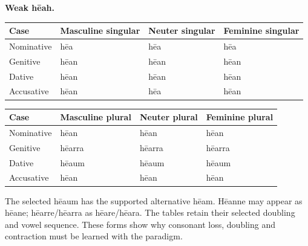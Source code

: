 \par\begin{minipage}{\linewidth}\raggedright
\textbf{Weak hēah.}

\par\begingroup
\fontsize{10.5}{13.2}\selectfont
\setlength{\LTleft}{0pt}\setlength{\LTright}{\fill}
\noindent
\begin{tabular}{@{}>{\raggedright\arraybackslash}p{22.0mm}>{\raggedright\arraybackslash}p{31.188mm}>{\raggedright\arraybackslash}p{31.188mm}>{\raggedright\arraybackslash}p{31.188mm}@{}}
\toprule
\textbf{Case} & \textbf{Masculine singular} & \textbf{Neuter singular} & \textbf{Feminine singular} \\
\midrule
Nominative & hēa & hēa & hēa \\
Genitive & hēan & hēan & hēan \\
Dative & hēan & hēan & hēan \\
Accusative & hēan & hēa & hēan \\
\bottomrule
\end{tabular}
\par\endgroup
\par\addvspace{5pt}
\par\begingroup
\fontsize{10.5}{13.2}\selectfont
\setlength{\LTleft}{0pt}\setlength{\LTright}{\fill}
\noindent
\begin{tabular}{@{}>{\raggedright\arraybackslash}p{22.0mm}>{\raggedright\arraybackslash}p{31.188mm}>{\raggedright\arraybackslash}p{31.188mm}>{\raggedright\arraybackslash}p{31.188mm}@{}}
\toprule
\textbf{Case} & \textbf{Masculine plural} & \textbf{Neuter plural} & \textbf{Feminine plural} \\
\midrule
Nominative & hēan & hēan & hēan \\
Genitive & hēarra & hēarra & hēarra \\
Dative & hēaum & hēaum & hēaum \\
Accusative & hēan & hēan & hēan \\
\bottomrule
\end{tabular}
\par\endgroup
\end{minipage}\par
The selected hēaum has the supported alternative hēam. Hēanne may appear as hēane; hēarre/\allowbreak{}hēarra as hēare/\allowbreak{}hēara. The tables retain their selected doubling and vowel sequence. These forms show why consonant loss, doubling and contraction must be learned with the paradigm.

